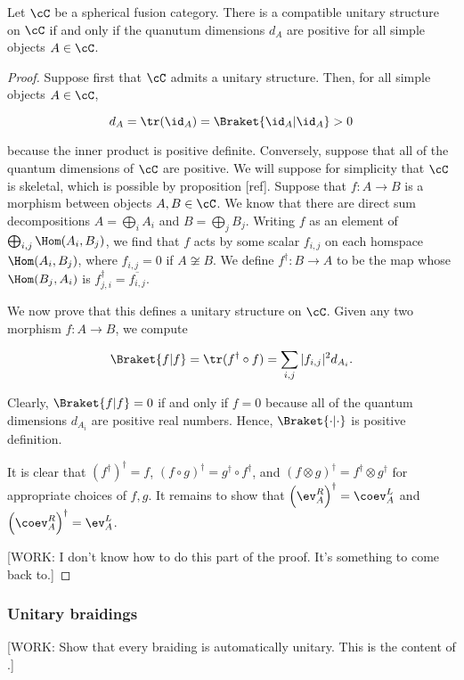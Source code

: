 \begin{prop} Let $\cC$ be a spherical fusion category. There is a compatible unitary structure on $\cC$ if and only if  the quanutum dimensions $d_A$ are positive for all simple objects $A\in \cC$. 
\end{prop}
\begin{proof} Suppose first that $\cC$ admits a unitary structure. Then, for all simple objects $A\in \cC$,

$$d_A=\tr(\id_{A})=\Braket{\id_{A} | \id_{A}}>0$$

because the inner product is positive definite. Conversely, suppose that all of the quantum dimensions of $\cC$ are positive. We will suppose for simplicity that $\cC$ is skeletal, which is possible by proposition [ref]. Suppose that $f:A\to B$ is a morphism between objects $A,B\in \cC$. We know that there are direct sum decompositions $A=\bigoplus_{i}A_i$ and $B=\bigoplus_{j}B_j$. Writing $f$ as an element of $\bigoplus_{i,j}\Hom(A_i,B_j)$, we find that $f$ acts by some scalar $f_{i,j}$ on each homspace $\Hom(A_i,B_j)$, where $f_{i,j}=0$ if $A\not\cong B$. We define $f^{\dagger}: B\to A$ to be the map whose $\Hom(B_j,A_i)$ is $f_{j,i}^{\dagger}=\overline{f_{i,j}}$.

We now prove that this defines a unitary structure on $\cC$. Given any two morphism $f:A\to B$, we compute

$$\Braket{f|f}=\tr(f^{\dagger}\circ f)=\sum_{i,j}|f_{i,j}|^2d_{A_i}.$$

Clearly, $\Braket{f|f}=0$ if and only if $f=0$ because all of the quantum dimensions $d_{A_i}$ are positive real numbers. Hence, $\Braket{\cdot|\cdot}$ is positive definition.

It is clear that $(f^{\dagger})^{\dagger}=f$, $(f\circ g)^{\dagger}=g^{\dagger}\circ f^{\dagger}$,  and $(f\otimes g)^{\dagger}=f^{\dagger}\otimes g^{\dagger}$ for appropriate choices of $f,g$. It remains to show that $\left(\ev^R_{A}\right)^{\dagger}=\coev^{L}_A$ and $\left(\coev^{R}_A\right)^{\dagger}=\ev^L_A$.

[WORK: I don't know how to do this part of the proof. It's something to come back to.]
\end{proof}

\subsubsection{Unitary braidings}

[WORK: Show that every braiding is automatically unitary. This is the content of \cite{galindo2014braided}.]

